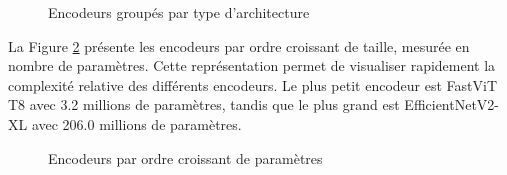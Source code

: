 \begin{figure}[H]
    \centering
    \caption{Encodeurs groupés par type d'architecture}
    \label{fig:ch36_architecture_03_backbone_taille_encodeur_famille}
\end{figure}

La Figure \ref{fig:ch36_architecture_04_backbone_taille_encodeur_ordonnee} présente les encodeurs par ordre croissant de taille, mesurée en nombre de paramètres. Cette représentation permet de visualiser rapidement la complexité relative des différents encodeurs. Le plus petit encodeur est FastViT T8 avec 3.2 millions de paramètres, tandis que le plus grand est EfficientNetV2-XL avec 206.0 millions de paramètres.

\begin{figure}[H]
    \centering
    \caption{Encodeurs par ordre croissant de paramètres}
    \label{fig:ch36_architecture_04_backbone_taille_encodeur_ordonnee}
\end{figure}

